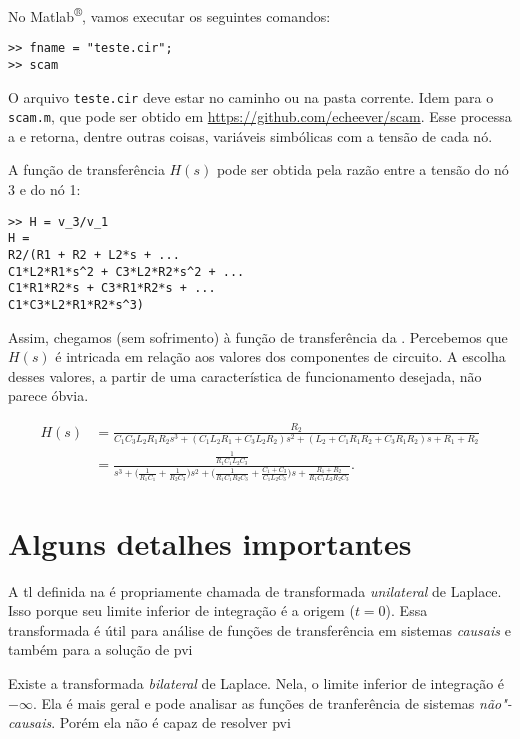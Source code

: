 No Matlab\textsuperscript{®}, vamos executar os seguintes comandos:
\begin{lstlisting}
>> fname = "teste.cir";
>> scam
\end{lstlisting}

O arquivo \lstinline{teste.cir} deve estar no caminho ou na pasta corrente. Idem para o  \lstinline{scam.m}, que pode ser obtido em \url{https://github.com/echeever/scam}. Esse  processa a  e retorna, dentre outras coisas, variáveis simbólicas com a tensão de cada nó.

A função de transferência $H(s)$ pode ser obtida pela razão entre a tensão do nó 3 e do nó 1:
\begin{lstlisting}
>> H = v_3/v_1
H =
R2/(R1 + R2 + L2*s + ...
C1*L2*R1*s^2 + C3*L2*R2*s^2 + ...
C1*R1*R2*s + C3*R1*R2*s + ...
C1*C3*L2*R1*R2*s^3)
\end{lstlisting}

Assim, chegamos (sem sofrimento) à função de transferência da . Percebemos que $H(s)$ é intricada em relação aos valores dos componentes de circuito. A escolha desses valores, a partir de uma característica de funcionamento desejada, não parece óbvia.

\begin{figure*}[tb]
\begin{equation}\begin{aligned}\label{eq:pi}
	H(s)&=\frac{R_2}{C_1C_3L_2R_1R_2s^3+(C_1L_2R_1+C_3L_2R_2)s^2+(L_2+C_1R_1R_2+C_3R_1R_2)s+R_1+R_2}\\
		&=\frac{\displaystyle\frac{1}{R_1C_1L_2C_3}}{\displaystyle s^3+\Big(\frac{1}{R_1C_1}+\frac{1}{R_2C_3}\Big)s^2+\Big(\frac{1}{R_1C_1R_2C_3}+\frac{C_1+C_3}{C_1L_2C_3}\Big)s+\frac{R_1+R_2}{R_1C_1L_2R_2C_3}}.
\end{aligned}\end{equation}
\end{figure*}

\section{Alguns detalhes importantes}

A \ac{tl} definida na  é propriamente chamada de transformada \emph{unilateral} de Laplace. Isso porque seu limite inferior de integração é a origem ($t=0$). Essa transformada é útil para análise de funções de transferência em sistemas \emph{causais} e também para a solução de \ac{pvi}

Existe a transformada \emph{bilateral} de Laplace. Nela, o limite inferior de integração é $-\infty$. Ela é mais geral e pode analisar as funções de tranferência de sistemas \emph{não"-causais}. Porém ela não é capaz de resolver \ac{pvi}

